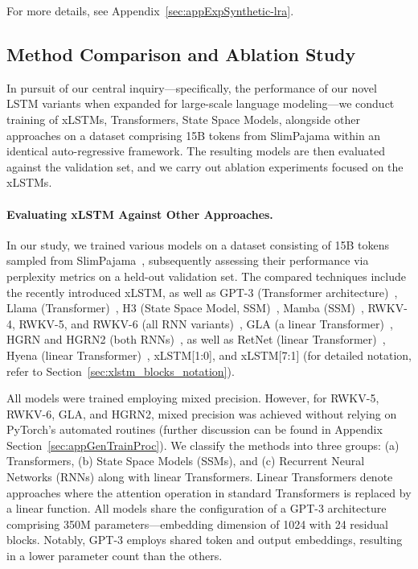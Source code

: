 For more details, see Appendix~\ref{sec:appExpSynthetic-lra}.

\subsection{Method Comparison and Ablation Study}
\label{sec:ExpComparison}

In pursuit of our central inquiry—specifically, the performance of our novel LSTM variants when expanded for large-scale language modeling—we conduct training of xLSTMs, Transformers, State Space Models, alongside other approaches on a dataset comprising 15B tokens from SlimPajama within an identical auto-regressive framework. The resulting models are then evaluated against the validation set, and we carry out ablation experiments focused on the xLSTMs.

\paragraph{Evaluating xLSTM Against Other Approaches.} In our study, we trained various models on a dataset consisting of 15B tokens sampled from SlimPajama~\citep{Soboleva:23}, subsequently assessing their performance via perplexity metrics on a held-out validation set. The compared techniques include the recently introduced xLSTM, as well as GPT-3 (Transformer architecture)~\citep{Brown:20short}, Llama (Transformer)~\citep{Touvron:23arxiv}, H3 (State Space Model, SSM)~\citep{Fu:23}, Mamba (SSM)~\citep{Gu:24arxiv}, RWKV-4, RWKV-5, and RWKV-6 (all RNN variants)~\citep{Peng:23arxivshort, Peng:24arxivshort}, GLA (a linear Transformer)~\citep{Yang:23arxiv}, HGRN and HGRN2 (both RNNs)~\citep{Qin:23, Qin:24arxiv}, as well as RetNet (linear Transformer)~\citep{Sun:23arxiv}, Hyena (linear Transformer)~\citep{Poli:23}, xLSTM[1:0], and xLSTM[7:1] (for detailed notation, refer to Section~\ref{sec:xlstm_blocks_notation}). 

All models were trained employing mixed precision. However, for RWKV-5, RWKV-6, GLA, and HGRN2, mixed precision was achieved without relying on PyTorch's automated routines (further discussion can be found in Appendix Section~\ref{sec:appGenTrainProc}). We classify the methods into three groups: (a) Transformers, (b) State Space Models (SSMs), and (c) Recurrent Neural Networks (RNNs) along with linear Transformers. Linear Transformers denote approaches where the attention operation in standard Transformers is replaced by a linear function. All models share the configuration of a GPT-3 architecture comprising 350M parameters—embedding dimension of 1024 with 24 residual blocks. Notably, GPT-3 employs shared token and output embeddings, resulting in a lower parameter count than the others.

